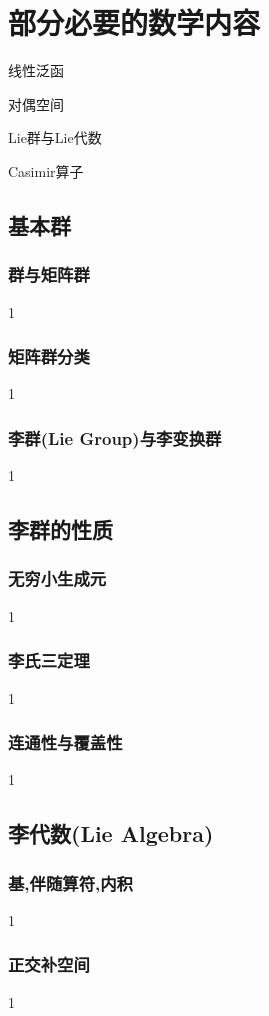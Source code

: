 \ifx\allfiles\undefined



	\else
	\fi
\chapter{部分必要的数学内容}
\begin{introduction}
	\item 线性泛函
	\item 对偶空间
	\item Lie群与Lie代数
	\item Casimir算子
\end{introduction}
\section{基本群}
\subsection{群与矩阵群}
1
\subsection{矩阵群分类}
1
\subsection{李群(Lie Group)与李变换群}
1
\section{李群的性质}
\subsection{无穷小生成元}
1
\subsection{李氏三定理}
1
\subsection{连通性与覆盖性}
1
\section{李代数(Lie Algebra)}
\subsection{基,伴随算符,内积}
1
\subsection{正交补空间}
1
